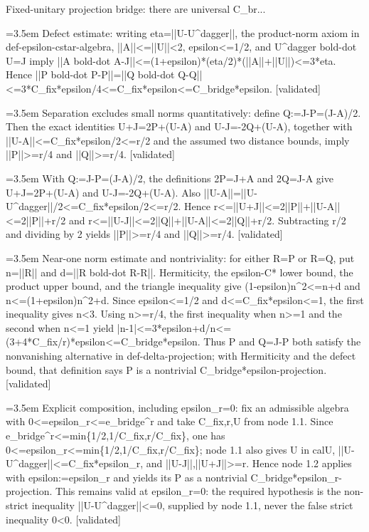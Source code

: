 \documentclass{article}
\newcommand{\step}[1]{\par\noindent\hangindent=3.5em\hangafter=1%
  \makebox[3.5em][l]{\textbf{#1.}}}
\newcommand{\steptag}[1]{\hfill{\small\textsf{[#1]}}}
\begin{document}
\begin{proofbox}{Fixed-unitary projection bridge: there are universal C\_br...}
\step{1.2.3} Defect estimate: writing eta=||U-U\textasciicircum{}dagger||, the product-norm axiom in def-epsilon-cstar-algebra, ||A||<=||U||<2, epsilon<=1/2, and U\textasciicircum{}dagger bold-dot U=J imply ||A bold-dot A-J||<=(1+epsilon)*(eta/2)*(||A||+||U||)<=3*eta. Hence ||P bold-dot P-P||=||Q bold-dot Q-Q||<=3*C\_fix*epsilon/4<=C\_fix*epsilon<=C\_bridge*epsilon. \steptag{validated} \\[4pt]
\step{1.2.4} Separation excludes small norms quantitatively: define Q:=J-P=(J-A)/2. Then the exact identities U+J=2P+(U-A) and U-J=-2Q+(U-A), together with ||U-A||<=C\_fix*epsilon/2<=r/2 and the assumed two distance bounds, imply ||P||>=r/4 and ||Q||>=r/4. \steptag{validated} \\[6pt]
\step{1.2.4.1} With Q:=J-P=(J-A)/2, the definitions 2P=J+A and 2Q=J-A give U+J=2P+(U-A) and U-J=-2Q+(U-A). Also ||U-A||=||U-U\textasciicircum{}dagger||/2<=C\_fix*epsilon/2<=r/2. Hence r<=||U+J||<=2||P||+||U-A||<=2||P||+r/2 and r<=||U-J||<=2||Q||+||U-A||<=2||Q||+r/2. Subtracting r/2 and dividing by 2 yields ||P||>=r/4 and ||Q||>=r/4. \steptag{validated} \\[4pt]
\step{1.2.5} Near-one norm estimate and nontriviality: for either R=P or R=Q, put n=||R|| and d=||R bold-dot R-R||. Hermiticity, the epsilon-C* lower bound, the product upper bound, and the triangle inequality give (1-epsilon)n\textasciicircum{}2<=n+d and n<=(1+epsilon)n\textasciicircum{}2+d. Since epsilon<=1/2 and d<=C\_fix*epsilon<=1, the first inequality gives n<3. Using n>=r/4, the first inequality when n>=1 and the second when n<=1 yield |n-1|<=3*epsilon+d/n<=(3+4*C\_fix/r)*epsilon<=C\_bridge*epsilon. Thus P and Q=J-P both satisfy the nonvanishing alternative in def-delta-projection; with Hermiticity and the defect bound, that definition says P is a nontrivial C\_bridge*epsilon-projection. \steptag{validated} \\[4pt]
\step{1.3} Explicit composition, including epsilon\_r=0: fix an admissible algebra with 0<=epsilon\_r<=e\_bridge\textasciicircum{}r and take C\_fix,r,U from node 1.1. Since e\_bridge\textasciicircum{}r<=min\{1/2,1/C\_fix,r/C\_fix\}, one has 0<=epsilon\_r<=min\{1/2,1/C\_fix,r/C\_fix\}; node 1.1 also gives U in calU, ||U-U\textasciicircum{}dagger||<=C\_fix*epsilon\_r, and ||U-J||,||U+J||>=r. Hence node 1.2 applies with epsilon:=epsilon\_r and yields its P as a nontrivial C\_bridge*epsilon\_r-projection. This remains valid at epsilon\_r=0: the required hypothesis is the non-strict inequality ||U-U\textasciicircum{}dagger||<=0, supplied by node 1.1, never the false strict inequality 0<0. \steptag{validated} \\[4pt]
\end{proofbox}
\end{document}
